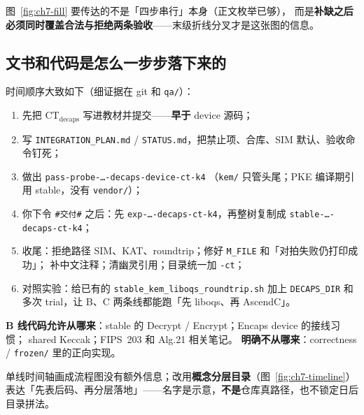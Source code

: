 \documentclass[UTF8,a4paper,11pt]{ctexart}
\theoremstyle{definition}
\theoremstyle{plain}
\theoremstyle{remark}
\numberwithin{figure}{section}
\numberwithin{table}{section}
\begin{document}
图~\ref{fig:ch7-fill} 要传达的不是「四步串行」本身（正文枚举已够），
而是\textbf{补缺之后必须同时覆盖合法与拒绝两条验收}——末级折线分叉才是这张图的信息。

\subsection{文书和代码是怎么一步步落下来的}
\label{sec:forward-docs-code}

时间顺序大致如下（细证据在 git 和 \texttt{qa/}）：
\begin{enumerate}
  \item 先把 $\mathrm{CT}_{\mathrm{decaps}}$ 写进教材并提交——\textbf{早于} device 源码；
  \item 写 \texttt{INTEGRATION\_PLAN.md} / \texttt{STATUS.md}，把禁止项、合库、SIM 默认、验收命令钉死；
  \item 做出 \texttt{pass-probe-…-decaps-device-ct-k4}
        （\texttt{kem/} 只管头尾；PKE 编译期引用 stable，没有 \texttt{vendor/}）；
  \item 你下令 \texttt{\#交付\#} 之后：先 \texttt{exp-…-decaps-ct-k4}，再整树复制成
        \texttt{stable-…-decaps-ct-k4}；
  \item 收尾：拒绝路径 SIM、KAT、roundtrip；修好 \texttt{M\_FILE} 和「对拍失败仍打印成功」；
        补中文注释；清幽灵引用；目录统一加 \texttt{-ct}；
  \item 对照实验：给已有的 \texttt{stable\_kem\_liboqs\_roundtrip.sh} 加上
        \texttt{DECAPS\_DIR} 和多次 trial，让 B、C 两条线都能跑「先 liboqs、再 AscendC」。
\end{enumerate}

\noindent\textbf{B 线代码允许从哪来}：stable 的 Decrypt / Encrypt；Encaps device 的接线习惯；
shared Keccak；FIPS~203 和 Alg.21 相关笔记。
\textbf{明确不从哪来}：correctness / \texttt{frozen/} 里的正向实现。

单线时间轴画成流程图没有额外信息；改用\textbf{概念分层目录}（图~\ref{fig:ch7-timeline}）
表达「先表后码、再分层落地」——名字是示意，\textbf{不是}仓库真路径，也不锁定日后目录拼法。
\end{document}
